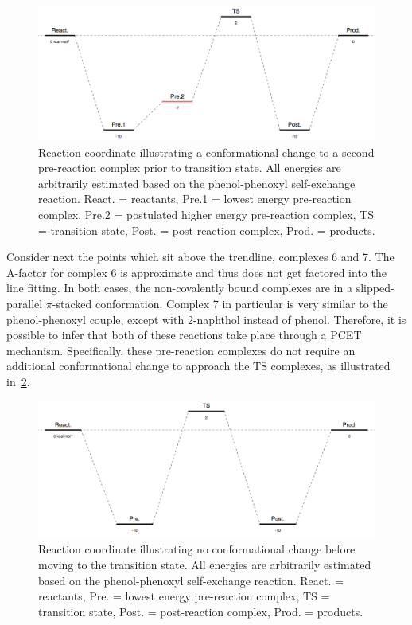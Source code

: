 \begin{figure}[htb]
  \centering
  \includegraphics[width=\textwidth]{figures/afactor-trend.png}
  \caption[Reaction coordinate illustrating a conformational change to a second pre-reaction complex prior to transition state.]{Reaction coordinate illustrating a conformational change to a second pre-reaction complex prior to transition state. All energies are arbitrarily estimated based on the phenol-phenoxyl self-exchange reaction. React. = reactants, Pre.1 = lowest energy pre-reaction complex, Pre.2 = postulated higher energy pre-reaction complex, TS = transition state, Post. = post-reaction complex, Prod. = products.}
\label{fig:afactor-trend}
\end{figure}

Consider next the points which sit above the trendline, complexes 6 and 7. The A-factor for complex 6 is approximate and thus does not get factored into the line fitting. In both cases, the non-covalently bound complexes are in a slipped-parallel $\pi$-stacked conformation. Complex 7 in particular is very similar to the phenol-phenoxyl couple, except with 2-naphthol instead of phenol. Therefore, it is possible to infer that both of these reactions take place through a PCET mechanism. Specifically, these pre-reaction complexes do not require an additional conformational change to approach the TS complexes, as illustrated in~\ref{fig:afactor-direct}.

\begin{figure}[htb]
  \centering
  \includegraphics[width=\textwidth]{figures/afactor-direct.png}
  \caption[Reaction coordinate illustrating no conformational change before moving to the transition state.]{Reaction coordinate illustrating no conformational change before moving to the transition state. All energies are arbitrarily estimated based on the phenol-phenoxyl self-exchange reaction. React. = reactants, Pre. = lowest energy pre-reaction complex, TS = transition state, Post. = post-reaction complex, Prod. = products.}
\label{fig:afactor-direct}
\end{figure}

